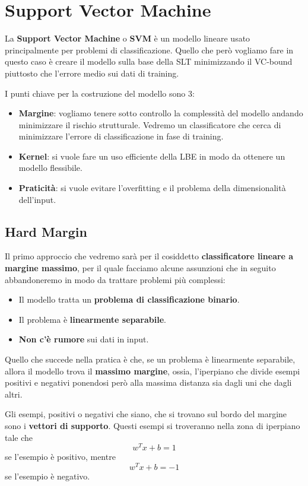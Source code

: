 \chapter{Support Vector Machine}
La \textbf{Support Vector Machine} o \textbf{SVM} \`e un modello lineare usato principalmente per problemi di
classificazione. Quello che per\`o vogliamo fare in questo caso \`e creare il modello sulla base della SLT minimizzando
il VC-bound piuttosto che l'errore medio sui dati di training.

I punti chiave per la costruzione del modello sono 3:
\begin{itemize}
	\item \textbf{Margine}: vogliamo tenere sotto controllo la complessit\`a del modello andando minimizzare il rischio
	      strutturale. Vedremo un classificatore che cerca di minimizzare l'errore di classificazione in fase di training.
	\item \textbf{Kernel}: si vuole fare un uso efficiente della LBE in modo da ottenere un modello flessibile.
	\item \textbf{Praticit\`a}: si vuole evitare l'overfitting e il problema della dimensionalit\`a dell'input.
\end{itemize}

\section{Hard Margin}
Il primo approccio che vedremo sar\`a per il cosiddetto \textbf{classificatore lineare a margine massimo}, per il quale
facciamo alcune assunzioni che in seguito abbandoneremo in modo da trattare problemi pi\`u complessi:
\begin{itemize}
	\item Il modello tratta un \textbf{problema di classificazione binario}.
	\item Il problema \`e \textbf{linearmente separabile}.
	\item \textbf{Non c'\`e rumore} sui dati in input.
\end{itemize}
Quello che succede nella pratica \`e che, se un problema \`e linearmente separabile, allora il modello trova il
\textbf{massimo margine}, ossia, l'iperpiano che divide esempi positivi e negativi ponendosi per\`o alla massima distanza
sia dagli uni che dagli altri.

Gli esempi, positivi o negativi che siano, che si trovano sul bordo del margine sono i \textbf{vettori di supporto}. Questi
esempi si troveranno nella zona di iperpiano tale che
\[ w^T x + b = 1 \]
se l'esempio \`e positivo, mentre
\[ w^T x + b = -1 \]
se l'esempio \`e negativo.

